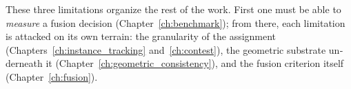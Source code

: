\begin{otherlanguage}{english}
These three limitations organize the rest of the work. First one must be able to \emph{measure} a
fusion decision (Chapter~\ref{ch:benchmark}); from there, each limitation is attacked on its own
terrain: the granularity of the assignment (Chapters~\ref{ch:instance_tracking}
and~\ref{ch:contest}), the geometric substrate underneath it
(Chapter~\ref{ch:geometric_consistency}), and the fusion criterion itself
(Chapter~\ref{ch:fusion}).

\end{otherlanguage}
